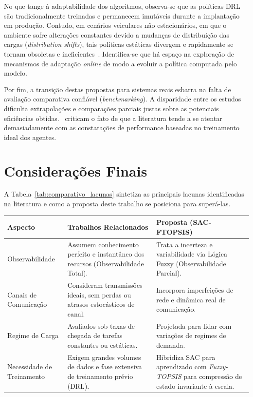 No que tange à adaptabilidade dos algoritmos, observa-se que as políticas \gls{DRL} são tradicionalmente treinadas e permanecem imutáveis durante a implantação em produção. Contudo, em cenários veiculares não estacionários, em que o ambiente sofre alterações constantes devido a mudanças de distribuição das cargas (\textit{distribution shifts}), tais políticas estáticas divergem e rapidamente se tornam obsoletas e ineficientes~\cite{miriyala2026}. Identifica-se que há espaço na exploração de mecanismos de adaptação \textit{online} de modo a evoluir a política computada pelo modelo.

Por fim, a transição destas propostas para sistemas reais esbarra na falta de avaliação comparativa confiável (\textit{benchmarking}). A disparidade entre os estudos dificulta extrapolações e comparações parciais justas sobre as potenciais eficiências obtidas.~\cite{miriyala2026} criticam o fato de que a literatura tende a se atentar demasiadamente com as constatações de performance baseadas no treinamento ideal dos agentes.

\section{Considerações Finais}
\label{sec:consideracoes-finais-revisao}

A Tabela~\ref{tab:comparativo_lacunas} sintetiza as principais lacunas identificadas na literatura e como a proposta deste trabalho se posiciona para superá-las.

\begin{table}[ht!]
    \centering
    \renewcommand{\arraystretch}{1.5}
    \small
    \setlength{\tabcolsep}{6pt}
    \begin{tabularx}{\textwidth}{|>{\raggedright\arraybackslash}p{3cm}|X|X|}
        \hline
        \textbf{Aspecto} & \textbf{Trabalhos Relacionados} & \textbf{Proposta (SAC-FTOPSIS)} \\ \hline
        Observabilidade & Assumem conhecimento perfeito e instantâneo dos recursos (Observabilidade Total). & Trata a incerteza e variabilidade via Lógica Fuzzy (Observabilidade Parcial). \\ \hline
        Canais de Comunicação & Consideram transmissões ideais, sem perdas ou atrasos estocásticos de canal. & Incorpora imperfeições de rede e dinâmica real de comunicação. \\ \hline
        Regime de Carga & Avaliados sob taxas de chegada de tarefas constantes ou estáticas. & Projetada para lidar com variações de regimes de demanda. \\ \hline
        Necessidade de Treinamento & Exigem grandes volumes de dados e fase extensiva de treinamento prévio (\gls{DRL}). & Hibridiza \gls{SAC} para aprendizado com \textit{Fuzzy-TOPSIS} para compressão de estado invariante à escala. \\ \hline
    \end{tabularx}
\end{table}

